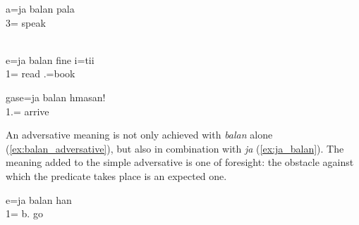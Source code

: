 
\ea\label{ex:jab1}
\gll a=ja balan pala\\
 3=  speak\\
\glt {}\\
\z


\ea\label{ex:jab2}
\gll 	e=ja balan fine i=tii	\\
	1=  read .=book	\\
\glt	{}%
\z


\ea
\gll gase={ja} balan hmasan!\\
 1.=  arrive\\
\glt {}
\z


An adversative meaning is not only achieved with \textit{balan} alone (\ref{ex:balan_adversative}), but also in combination with \textit{ja}  (\ref{ex:ja_balan}). The meaning added to the simple adversative is one of foresight: the obstacle against which the predicate takes place is an expected one.

\ea
\gll e=ja balan han\\
 1= b. go\\
\glt {}
\z

